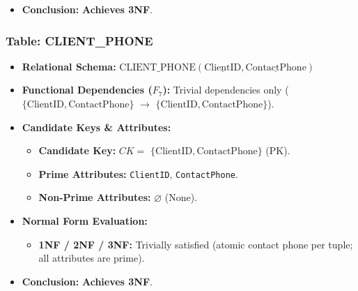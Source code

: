 \documentclass[a4paper,12pt]{report}
\providecommand{\tightlist}{%
  \setlength{\itemsep}{0pt}\setlength{\parskip}{0pt}}
\begin{document}
\begin{itemize}
  \begin{itemize}
  \item
    \textbf{1NF:} Satisfied (composite address decomposed into \texttt{Street}, \texttt{Ward}, \texttt{District}, \texttt{City}; phone numbers stored in \texttt{CLIENT\_\allowbreak{}PHONE}).
  \item
    \textbf{2NF:} Satisfied (all candidate keys are single attributes; partial dependencies are impossible).
  \item
    \textbf{3NF:} Satisfied (all determinants are superkeys; no transitive dependencies among non-prime attributes).
  \end{itemize}
\item
  \textbf{Conclusion:} \textbf{Achieves 3NF}.
\end{itemize}

\subsubsection{\texorpdfstring{Table: CLIENT\_\allowbreak{}PHONE}{Table: CLIENTPHONE}}\label{table-client_phone}

\begin{itemize}
\item
  \textbf{Relational Schema:} \(\text{CLIENT\_PHONE}(\underline{\text{ClientID}}, \underline{\text{ContactPhone}})\)
\item
  \textbf{Functional Dependencies (\(F_{7}\)):} Trivial dependencies only (\(\{\text{ClientID}, \text{ContactPhone}\}\) \(\rightarrow\) \(\{\text{ClientID}, \text{ContactPhone}\}\)).
\item
  \textbf{Candidate Keys \& Attributes:}

  \begin{itemize}
  \item
    \textbf{Candidate Key:} \(CK =\) \(\{\text{ClientID}, \text{ContactPhone}\}\) (PK).
  \item
    \textbf{Prime Attributes:} \texttt{ClientID}, \texttt{ContactPhone}.
  \item
    \textbf{Non-Prime Attributes:} \(\varnothing\) (None).
  \end{itemize}
\item
  \textbf{Normal Form Evaluation:}

  \begin{itemize}
  \tightlist
  \item
    \textbf{1NF / 2NF / 3NF:} Trivially satisfied (atomic contact phone per tuple; all attributes are prime).
  \end{itemize}
\item
  \textbf{Conclusion:} \textbf{Achieves 3NF}.
\end{itemize}
\end{document}
